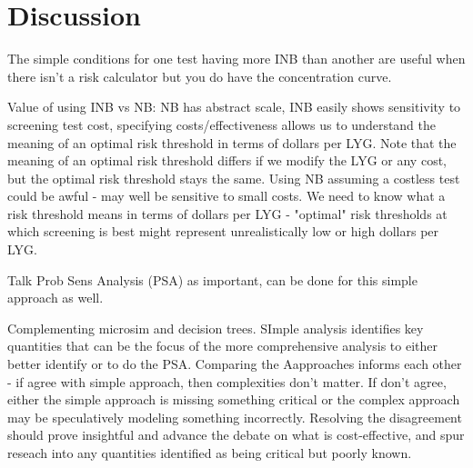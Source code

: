 \documentclass[11pt, letterpaper]{article}
\begin{document}
% 
% 



\section{Discussion}
\label{Discussion}


The simple conditions for one test having more INB than another are useful when there isn't a risk calculator but you do have the concentration curve.

Value of using INB vs NB: NB has abstract scale, INB easily shows sensitivity to screening test cost, specifying costs/effectiveness allows us to understand the meaning of an optimal risk threshold in terms of dollars per LYG.  Note that the meaning of an optimal risk threshold differs if we modify the LYG or any cost, but the optimal risk threshold stays the same.  Using NB assuming a costless test could be awful - may well be sensitive to small costs.  We need to know what a risk threshold means in terms of dollars per LYG - "optimal" risk thresholds at which screening is best might represent unrealistically low or high dollars per LYG.

Talk Prob Sens Analysis (PSA) as important, can be done for this simple approach as well.

Complementing microsim and decision trees.  SImple analysis identifies key quantities that can be the focus of the more comprehensive analysis to either better identify or to do the PSA.  Comparing the Aapproaches informs each other - if agree with simple approach, then complexities don't matter.  If don't agree, either the simple approach is missing something critical or the complex approach may be speculatively modeling something incorrectly.  Resolving the disagreement should prove insightful and advance the debate on what is cost-effective, and spur reseach into any quantities identified as being critical but poorly known.
\end{document}

